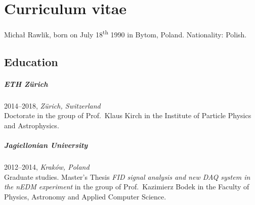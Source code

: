 



\manualmark
\markboth{\spacedlowsmallcaps{\bibname}}{\spacedlowsmallcaps{\bibname}} 


\begingroup

\let\clearpage\relax
\let\cleardoublepage\relax
\let\cleardoublepage\relax

\chapter*{Curriculum vitae} %

Michał Rawlik, born on July 18\textsuperscript{th} 1990 in Bytom, Poland. Nationality: Polish. 

\bigskip

\section*{Education}
\paragraph{ETH Zürich} 2014--2018, \emph{Zürich, Switzerland}\\
Doctorate in the group of Prof.\ Klaus Kirch in the Institute of Particle Physics and Astrophysics.

\paragraph{Jagiellonian University} 2012--2014, \emph{Kraków, Poland}\\
Graduate studies. Master's Thesis \emph{FID signal analysis and new DAQ system in the nEDM experiment} in the group of Prof.\ Kazimierz Bodek in the
Faculty of Physics, Astronomy and Applied Computer Science.

